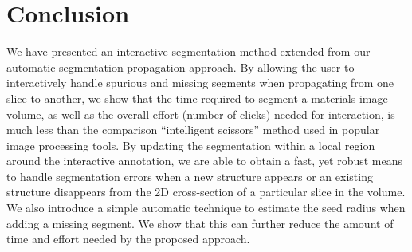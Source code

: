 \documentclass[]{spie}  %
\begin{document}
\section{Conclusion}
\label{sec:conclusion}

We have presented an interactive segmentation method extended from our
automatic segmentation propagation approach.  By allowing the user to
interactively handle spurious and missing segments when propagating
from one slice to another, we show that the time required to segment a
materials image volume, as well as the overall effort (number of
clicks) needed for interaction, is much less than the comparison
``intelligent scissors'' method used in popular image processing
tools.  By updating the segmentation within a local region around the
interactive annotation, we are able to obtain a fast, yet robust means
to handle segmentation errors when a new structure appears or an
existing structure disappears from the 2D cross-section of a
particular slice in the volume.  We also introduce a simple automatic
technique to estimate the seed radius when adding a missing segment.
We show that this can further reduce the amount of time and effort
needed by the proposed approach.


\end{document}

